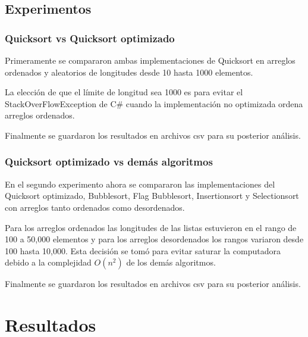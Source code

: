 \documentclass[conference]{IEEEtran}
\begin{document}
\subsection{Experimentos}
\subsubsection{Quicksort vs Quicksort optimizado}
Primeramente se compararon ambas implementaciones de Quicksort en arreglos ordenados y aleatorios de longitudes desde 10 hasta 1000 elementos.\par
La elección de que el límite de longitud sea 1000 es para evitar el StackOverFlowException de C\# cuando la implementación no optimizada ordena arreglos ordenados.\par
Finalmente se guardaron los resultados en archivos csv para su posterior análisis.



\subsubsection{Quicksort optimizado vs demás algoritmos}
En el segundo experimento ahora se compararon las implementaciones del Quicksort optimizado, Bubblesort, Flag Bubblesort, Insertionsort y Selectionsort con arreglos tanto ordenados como desordenados.\par
Para los arreglos ordenados las longitudes de las listas estuvieron en el rango de 100 a 50,000 elementos y para los arreglos desordenados los rangos variaron desde 100 hasta 10,000. Esta decisión se tomó para evitar saturar la computadora debido a la complejidad $O(n^2)$ de los demás algoritmos.\par
Finalmente se guardaron los resultados en archivos csv para su posterior análisis.



\section{Resultados}
\end{document}

